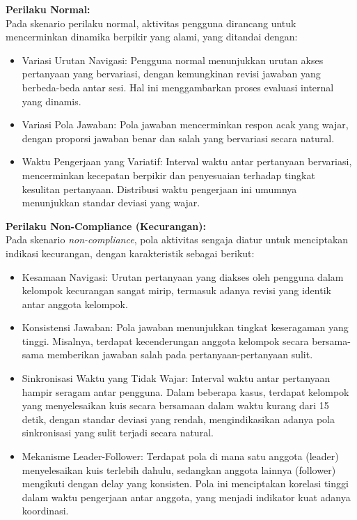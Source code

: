 \textbf{Perilaku Normal:} \\
Pada skenario perilaku normal, aktivitas pengguna dirancang untuk mencerminkan dinamika berpikir yang alami, yang ditandai dengan:
\begin{itemize}
    \item Variasi Urutan Navigasi: Pengguna normal menunjukkan urutan akses pertanyaan yang bervariasi, dengan kemungkinan revisi jawaban yang berbeda-beda antar sesi. Hal ini menggambarkan proses evaluasi internal yang dinamis.
    \item Variasi Pola Jawaban: Pola jawaban mencerminkan respon acak yang wajar, dengan proporsi jawaban benar dan salah yang bervariasi secara natural.
    \item Waktu Pengerjaan yang Variatif: Interval waktu antar pertanyaan bervariasi, mencerminkan kecepatan berpikir dan penyesuaian terhadap tingkat kesulitan pertanyaan. Distribusi waktu pengerjaan ini umumnya menunjukkan standar deviasi yang wajar.
\end{itemize}

\textbf{Perilaku Non-Compliance (Kecurangan):} \\
Pada skenario \textit{non-compliance}, pola aktivitas sengaja diatur untuk menciptakan indikasi kecurangan, dengan karakteristik sebagai berikut:
\begin{itemize}
    \item Kesamaan Navigasi: Urutan pertanyaan yang diakses oleh pengguna dalam kelompok kecurangan sangat mirip, termasuk adanya revisi yang identik antar anggota kelompok.
    \item Konsistensi Jawaban: Pola jawaban menunjukkan tingkat keseragaman yang tinggi. Misalnya, terdapat kecenderungan anggota kelompok secara bersama-sama memberikan jawaban salah pada pertanyaan-pertanyaan sulit.
    \item Sinkronisasi Waktu yang Tidak Wajar: Interval waktu antar pertanyaan hampir seragam antar pengguna. Dalam beberapa kasus, terdapat kelompok yang menyelesaikan kuis secara bersamaan dalam waktu kurang dari 15 detik, dengan standar deviasi yang rendah, mengindikasikan adanya pola sinkronisasi yang sulit terjadi secara natural.
    \item Mekanisme Leader-Follower: Terdapat pola di mana satu anggota (leader) menyelesaikan kuis terlebih dahulu, sedangkan anggota lainnya (follower) mengikuti dengan delay yang konsisten. Pola ini menciptakan korelasi tinggi dalam waktu pengerjaan antar anggota, yang menjadi indikator kuat adanya koordinasi.
\end{itemize}


